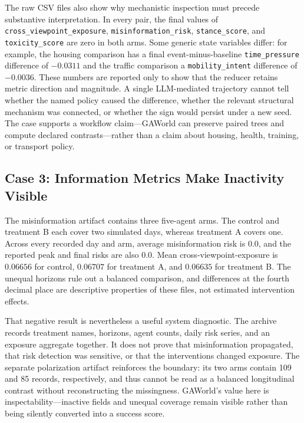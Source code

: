 The raw CSV files also show why mechanistic inspection must precede substantive
interpretation.  In every pair, the final values of
\texttt{cross\_viewpoint\_exposure}, \texttt{misinformation\_risk},
\texttt{stance\_score}, and \texttt{toxicity\_score} are zero in both arms.
Some generic state variables differ: for example, the housing comparison has
a final event-minus-baseline \texttt{time\_pressure} difference of $-0.0311$
and the traffic comparison a \texttt{mobility\_intent} difference of
$-0.0036$.  These numbers are reported only to show that the reducer retains
metric direction and magnitude.  A single LLM-mediated trajectory cannot tell
whether the named policy caused the difference, whether the relevant
structural mechanism was connected, or whether the sign would persist under a
new seed.  The case supports a workflow claim---GAWorld can preserve paired
trees and compute declared contrasts---rather than a claim about housing,
health, training, or transport policy.

\subsection{Case 3: Information Metrics Make Inactivity Visible}

The misinformation artifact contains three five-agent arms.  The control and
treatment B each cover two simulated days, whereas treatment A covers one.
Across every recorded day and arm, average misinformation risk is $0.0$, and
the reported peak and final risks are also $0.0$.  Mean
cross-viewpoint-exposure is $0.06656$ for control, $0.06707$ for treatment A,
and $0.06635$ for treatment B.  The unequal horizons rule out a balanced
comparison, and differences at the fourth decimal place are descriptive
properties of these files, not estimated intervention effects.

That negative result is nevertheless a useful system diagnostic.  The archive
records treatment names, horizons, agent counts, daily risk series, and an
exposure aggregate together.  It does not prove that
misinformation propagated, that risk detection was sensitive, or that the
interventions changed exposure.  The separate polarization artifact reinforces
the boundary: its two arms contain 109 and 85 records, respectively, and thus
cannot be read as a balanced longitudinal contrast without reconstructing the
missingness.  GAWorld's value here is inspectability---inactive fields and
unequal coverage remain visible rather than being silently converted into a
success score.

